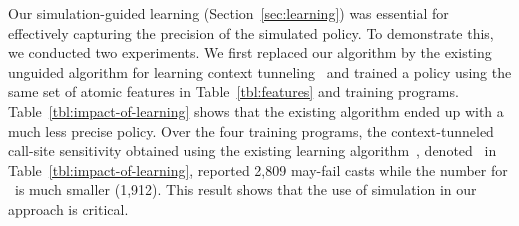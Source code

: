 



Our simulation-guided learning (Section~\ref{sec:learning}) was essential for effectively capturing the precision of the simulated policy. 
To demonstrate this, we conducted two
experiments. 
We first replaced our algorithm by the existing
unguided algorithm for learning context tunneling~\cite{JeJeOh18} and trained a policy using the same set of
atomic features in Table~\ref{tbl:features} and training programs.  
Table~\ref{tbl:impact-of-learning} shows that the existing algorithm ended up with a much less precise policy.
Over the four training programs, the context-tunneled call-site sensitivity obtained using the existing learning algorithm~\cite{JeJeOh18}, denoted \Existing~in Table~\ref{tbl:impact-of-learning}, reported 2,809 may-fail casts while the
number for \OurLearn~is much smaller (1,912). This result shows that the use of simulation in our approach 
is critical.
 
